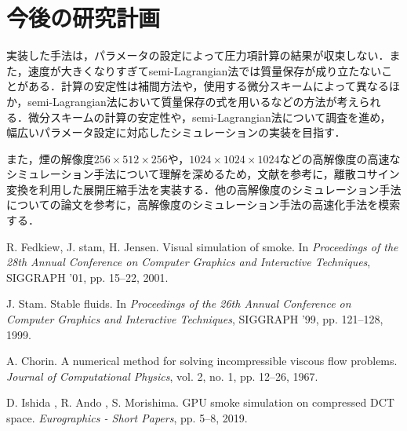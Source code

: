 \documentclass[10pt,a4paper,notitlepage,oneside,twocolumn]{abst_jsarticle}
\begin{document}
\section{今後の研究計画}
実装した手法は，パラメータの設定によって圧力項計算の結果が収束しない．また，速度が大きくなりすぎてsemi-Lagrangian法では質量保存が成り立たないことがある．計算の安定性は補間方法や，使用する微分スキームによって異なるほか，semi-Lagrangian法において質量保存の式を用いるなどの方法が考えられる．微分スキームの計算の安定性や，semi-Lagrangian法について調査を進め，幅広いパラメータ設定に対応したシミュレーションの実装を目指す．

また，煙の解像度$256\times512\times256$や，$1024\times1024\times1024$などの高解像度の高速なシミュレーション手法について理解を深めるため，文献\cite{GPU}を参考に，離散コサイン変換を利用した展開圧縮手法を実装する．他の高解像度のシミュレーション手法についての論文を参考に，高解像度のシミュレーション手法の高速化手法を模索する．
\begin{thebibliography}{99}

R. Fedkiew, J. stam, H. Jensen. Visual simulation of smoke. In \textit{Proceedings of the 28th Annual Conference on Computer Graphics and Interactive Techniques}, SIGGRAPH ’01, pp. 15--22, 2001.

J. Stam. Stable fluids. In \textit{Proceedings of the 26th Annual Conference on Computer Graphics and Interactive Techniques}, SIGGRAPH ’99, pp. 121--128, 1999.

A. Chorin. A numerical method for solving incompressible viscous flow problems. \textit{Journal of Computational Physics}, vol. 2, no. 1, pp. 12--26, 1967.

D. Ishida , R. Ando , S. Morishima. GPU smoke simulation on compressed DCT space. \textit{Eurographics - Short Papers}, pp. 5--8, 2019.

\end{thebibliography}
\end{document}
